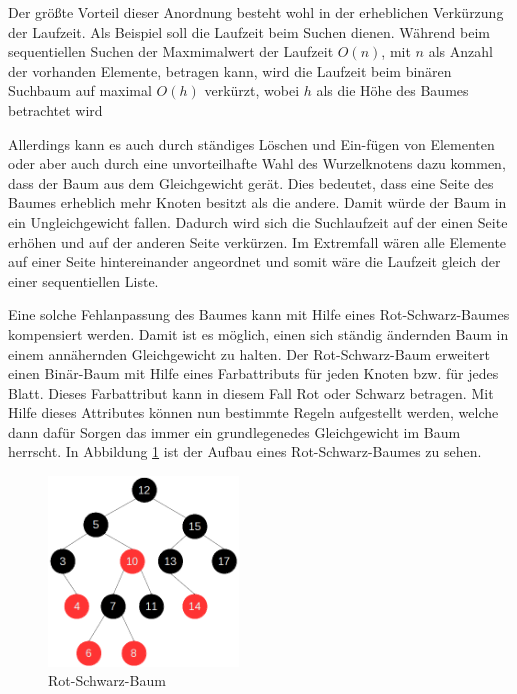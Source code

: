 Der größte Vorteil dieser Anordnung besteht wohl in der erheblichen Verkürzung der Laufzeit. 
Als Beispiel soll die Laufzeit beim Suchen dienen.
Während beim sequentiellen Suchen der Maxmimalwert der Laufzeit $O(n)$, mit $n$ als Anzahl der vorhanden Elemente, betragen kann, wird die Laufzeit beim binären Suchbaum auf maximal $O(h)$ verkürzt, wobei $h$ als die Höhe des Baumes betrachtet wird \cite[S.293]{tcormen}

Allerdings kann es auch durch ständiges Löschen und Ein-fügen von Elementen oder aber auch durch eine unvorteilhafte Wahl des Wurzelknotens dazu kommen, dass der Baum aus dem Gleichgewicht gerät. Dies bedeutet, dass eine Seite des Baumes erheblich mehr Knoten besitzt als die andere. Damit würde der Baum in ein Ungleichgewicht fallen. Dadurch wird sich die Suchlaufzeit auf der einen Seite erhöhen und auf der anderen Seite ver\-kürzen. Im Extremfall wären alle Elemente auf einer Seite hintereinander angeordnet und somit wäre die Laufzeit gleich der einer sequentiellen Liste.

Eine solche Fehlanpassung des Baumes kann mit Hilfe eines Rot-Schwarz-Baumes kompensiert werden. Damit ist es möglich, einen sich ständig ändernden Baum in einem annähernden Gleichgewicht zu halten. 
Der Rot-Schwarz-Baum erweitert einen Binär-Baum mit Hilfe eines Farbattributs für jeden Knoten bzw. für jedes Blatt. Dieses Farbattribut kann in diesem Fall Rot oder Schwarz betragen. Mit Hilfe dieses Attributes können nun bestimmte Regeln aufgestellt werden, welche dann dafür Sorgen das immer ein grundlegenedes Gleichgewicht im Baum herrscht. In Abbildung \ref{fig:rbtree} ist der Aufbau eines Rot-Schwarz-Baumes zu sehen.

\begin{figure}[h]
	\centering
	\includegraphics[width=0.45\textwidth]{pictures/redblacktree.png}
	\caption{Rot-Schwarz-Baum}
	\label{fig:rbtree}
\end{figure}

